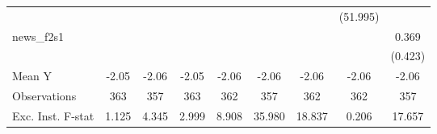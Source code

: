{\begin{tabular}{l*{8}{c}}
            &                     &                     &                     &                     &                     &                     &    (51.995)         &                     \\
\addlinespace
news\_f2s1   &                     &                     &                     &                     &                     &                     &                     &       0.369         \\
            &                     &                     &                     &                     &                     &                     &                     &     (0.423)         \\
\midrule
Mean Y      &       -2.05         &       -2.06         &       -2.05         &       -2.06         &       -2.06         &       -2.06         &       -2.06         &       -2.06         \\
Observations&         363         &         357         &         363         &         362         &         357         &         362         &         362         &         357         \\
Exc. Inst. F-stat&       1.125         &       4.345         &       2.999         &       8.908         &      35.980         &      18.837         &       0.206         &      17.657         \\
\bottomrule
\end{tabular}
}

